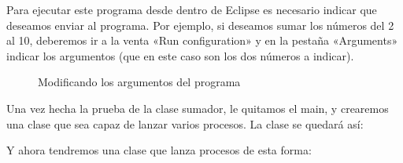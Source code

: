 \documentclass[letterpaper,10pt,spanish]{sphinxmanual}
\begin{document}
Para ejecutar este programa desde dentro de Eclipse es necesario indicar que deseamos enviar  al programa. Por ejemplo, si deseamos sumar los números del 2 al 10, deberemos ir a la venta «Run configuration» y en la pestaña «Arguments» indicar los argumentos (que en este caso son los dos números a indicar).

\begin{figure}[htbp]
\centering
\capstart

\noindent{}
\caption{Modificando los argumentos del programa}\label{\detokenize{textos/tema1:id1}}\end{figure}

Una vez hecha la prueba de la clase sumador, le quitamos el main, y crearemos una clase que sea capaz de lanzar varios procesos. La clase  se quedará así:

\begin{sphinxVerbatim}[commandchars=\\\{\}]
   
             
                 
                  
                 
\end{sphinxVerbatim}

Y ahora tendremos una clase que lanza procesos de esta forma:
\end{document}

